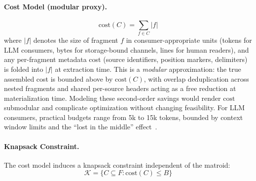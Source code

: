 \documentclass[11pt, a4paper]{article}
\begin{document}
\paragraph{Cost Model (modular proxy).}
\begin{equation}
\mathrm{cost}(C) = \sum_{f \in C} |f|
\end{equation}
where $|f|$ denotes the size of fragment $f$ in consumer-appropriate units (tokens for LLM consumers, bytes for storage-bound channels, lines for human readers), and any per-fragment metadata cost (source identifiers, position markers, delimiters) is folded into $|f|$ at extraction time. This is a \emph{modular} approximation: the true assembled cost is bounded above by $\mathrm{cost}(C)$, with overlap deduplication across nested fragments and shared per-source headers acting as a free reduction at materialization time. Modeling these second-order savings would render $\mathrm{cost}$ submodular and complicate optimization without changing feasibility. For LLM consumers, practical budgets range from 5k to 15k tokens, bounded by context window limits and the ``lost in the middle'' effect~\cite{liu2023lost}.

\paragraph{Knapsack Constraint.} The cost model induces a knapsack constraint independent of the matroid:
\begin{equation}
\mathcal{K} = \{C \subseteq F : \mathrm{cost}(C) \leq B\}
\end{equation}
\end{document}
